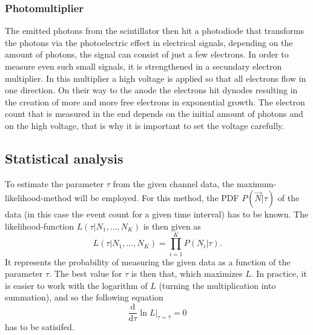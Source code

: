 \documentclass[english,  %
parskip=full,   %
headsepline]{scrartcl}
\newcommand{\diff}[1]{\frac{\mathrm{d}}{\mathrm{d}#1}}
\begin{document}
\subsubsection{Photomultiplier}
The emitted photons from the scintillator then hit a photodiode that transforms the photons via the photoelectric effect in electrical signals, depending on the amount of photons, the signal can consist of just a few electrons. In order to measure even such small signals, it is strengthened in a secundary electron multiplier. In this multiplier a high voltage is applied so that all electrons flow in one direction. On their way to the anode the electrons hit dynodes resulting in the creation of more and more free electrons in exponential growth. The electron count that is measured in the end depends on the initial amount of photons and on the high voltage, that is why it is important to set the voltage carefully.

\subsection{Statistical analysis}
To estimate the parameter $\tau$ from the given channel data, the maximum-likelihood-method will be employed. For this method, the PDF $P(\Vec{N}|\tau)$ of the data (in this case the event count for a given time interval) has to be known. The likelihood-function $L(\tau|N_1, \dots, N_K)$ is then given as
\[
L(\tau|N_1, \dots, N_K)=\prod_{i=1}^KP(N_i|\tau).
\]
It represents the probability of measuring the given data as a function of the parameter $\tau$. The best value for $\tau$ is then that, which maximizes $L$. In practice, it is easier to work with the logarithm of $L$ (turning the multiplication into summation), and so the following equation
\[
\diff{\tau}\ln L\left. \right|_{\tau=\hat{\tau}}=0\label{eq:Lcond}
\]
has to be satisifed.
\end{document}
